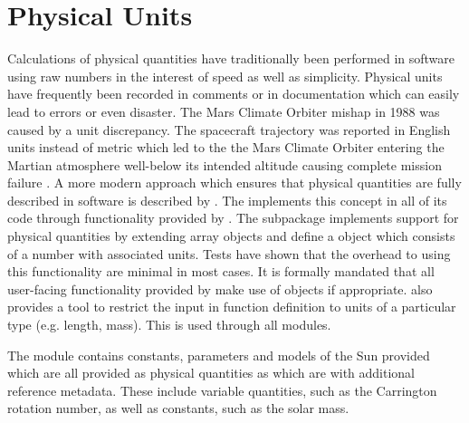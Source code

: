 \section{Physical Units}
\label{sec:units}

Calculations of physical quantities have traditionally been performed in software using raw numbers in the interest of speed as well as simplicity.
Physical units have frequently been recorded in comments or in documentation which can easily lead to errors or even disaster.
The Mars Climate Orbiter mishap in 1988 was caused by a unit discrepancy.
The spacecraft trajectory was reported in English units instead of metric which led to the the Mars Climate Orbiter entering the Martian atmosphere well-below its intended altitude causing complete mission failure \citep{mco_mishap_report}.
A more modern approach which ensures that physical quantities are fully described in software is described by \citep{Damevski2009}.
The \sunpypkg implements this concept in all of its code through functionality provided by \astropy.
The  subpackage implements support for physical quantities by extending \numpy array objects and define a  object which consists of a number with associated units.
Tests have shown that the overhead to using this functionality are minimal in most cases.
It is formally mandated that all user-facing functionality provided by \sunpypkg make use of  objects if appropriate.
 also provides a tool to restrict the input in function definition to units of a particular type (e.g. length, mass).
This is used through all \sunpypkg modules.

The  module contains constants, parameters and models of the Sun provided which are all provided as physical quantities as  which are  with additional reference metadata.
These include variable quantities, such as the Carrington rotation number, as well as constants, such as the solar mass.

